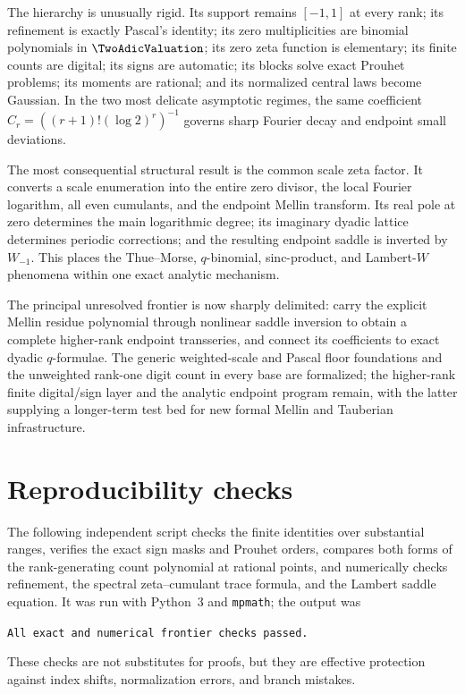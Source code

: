 \documentclass[11pt,oneside]{article}
\theoremstyle{definition}
\theoremstyle{remark}
\begin{document}
The hierarchy is unusually rigid.  Its support remains $[-1,1]$ at every rank; its refinement is exactly Pascal's identity; its zero multiplicities are binomial polynomials in $\TwoAdicValuation$; its zero zeta function is elementary; its finite counts are digital; its signs are automatic; its blocks solve exact Prouhet problems; its moments are rational; and its normalized central laws become Gaussian.  In the two most delicate asymptotic regimes, the same coefficient
$C_r=((r+1)!(\log2)^r)^{-1}$ governs sharp Fourier decay and endpoint small deviations.

The most consequential structural result is the common scale zeta factor.  It converts a scale enumeration into the entire zero divisor, the local Fourier logarithm, all even cumulants, and the endpoint Mellin transform.  Its real pole at zero determines the main logarithmic degree; its imaginary dyadic lattice determines periodic corrections; and the resulting endpoint saddle is inverted by $W_{-1}$.  This places the Thue--Morse, $q$-binomial, sinc-product, and Lambert-$W$ phenomena within one exact analytic mechanism.

The principal unresolved frontier is now sharply delimited: carry the explicit Mellin residue polynomial through nonlinear saddle inversion to obtain a complete higher-rank endpoint transseries, and connect its coefficients to exact dyadic $q$-formulae.  The generic weighted-scale and Pascal floor foundations and the unweighted rank-one digit count in every base are formalized; the higher-rank finite digital/sign layer and the analytic endpoint program remain, with the latter supplying a longer-term test bed for new formal Mellin and Tauberian infrastructure.


\appendix

\section{Reproducibility checks}\label{p3:app:checks}

The following independent script checks the finite identities over substantial ranges, verifies the exact sign masks and Prouhet orders, compares both forms of the rank-generating count polynomial at rational points, and numerically checks refinement, the spectral zeta--cumulant trace formula, and the Lambert saddle equation.  It was run with Python~3 and \texttt{mpmath}; the output was
\begin{center}
\texttt{All exact and numerical frontier checks passed.}
\end{center}
These checks are not substitutes for proofs, but they are effective protection against index shifts, normalization errors, and branch mistakes.
\end{document}
